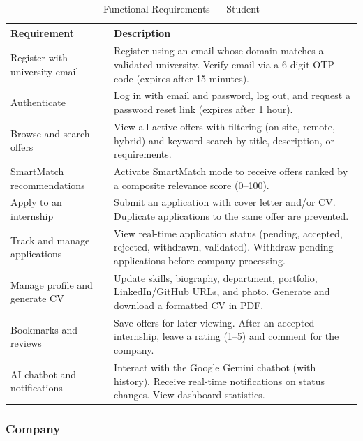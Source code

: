 \begin{table}[H]
\centering
\caption{Functional Requirements --- Student}
\label{tab:fr-student}
\begin{tabular}{|p{4cm}|p{10cm}|}
\hline
\textbf{Requirement} & \textbf{Description} \\
\hline
Register with university email & Register using an email whose domain matches a validated university. Verify email via a 6-digit OTP code (expires after 15 minutes). \\
\hline
Authenticate & Log in with email and password, log out, and request a password reset link (expires after 1 hour). \\
\hline
Browse and search offers & View all active offers with filtering (on-site, remote, hybrid) and keyword search by title, description, or requirements. \\
\hline
SmartMatch recommendations & Activate SmartMatch mode to receive offers ranked by a composite relevance score (0--100). \\
\hline
Apply to an internship & Submit an application with cover letter and/or CV. Duplicate applications to the same offer are prevented. \\
\hline
Track and manage applications & View real-time application status (pending, accepted, rejected, withdrawn, validated). Withdraw pending applications before company processing. \\
\hline
Manage profile and generate CV & Update skills, biography, department, portfolio, LinkedIn/GitHub URLs, and photo. Generate and download a formatted CV in PDF. \\
\hline
Bookmarks and reviews & Save offers for later viewing. After an accepted internship, leave a rating (1--5) and comment for the company. \\
\hline
AI chatbot and notifications & Interact with the Google Gemini chatbot (with history). Receive real-time notifications on status changes. View dashboard statistics. \\
\hline
\end{tabular}
\end{table}

\subsubsection{Company}

